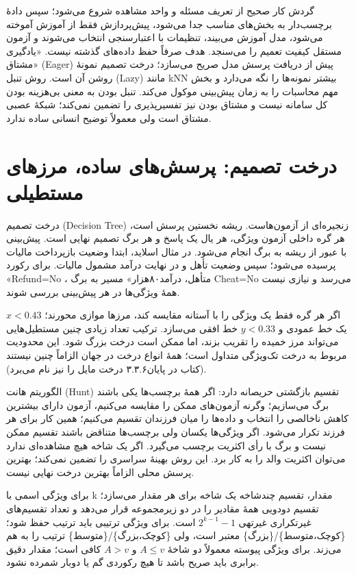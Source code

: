 گردش کار صحیح از تعریف مسئله و واحد مشاهده شروع می‌شود؛ سپس دادهٔ برچسب‌دار به بخش‌های مناسب جدا می‌شود، پیش‌پردازش فقط از آموزش آموخته می‌شود، مدل آموزش می‌بیند، تنظیمات با اعتبارسنجی انتخاب می‌شوند و آزمون مستقل کیفیت تعمیم را می‌سنجد. هدف صرفاً حفظ داده‌های گذشته نیست. «یادگیری مشتاق» (Eager) پیش از دریافت پرسش مدل صریح می‌سازد؛ درخت تصمیم نمونهٔ روشن آن است. روش تنبل (Lazy) مانند kNN بیشتر نمونه‌ها را نگه می‌دارد و بخش مهم محاسبات را به زمان پیش‌بینی موکول می‌کند. تنبل بودن به معنی بی‌هزینه بودن کل سامانه نیست و مشتاق بودن نیز تفسیرپذیری را تضمین نمی‌کند؛ شبکهٔ عصبی مشتاق است ولی معمولاً توضیح انسانی ساده ندارد.



\section{درخت تصمیم: پرسش‌های ساده، مرزهای مستطیلی}

درخت تصمیم (Decision Tree) زنجیره‌ای از آزمون‌هاست. ریشه نخستین پرسش است، هر گره داخلی آزمون ویژگی، هر یال یک پاسخ و هر برگ تصمیم نهایی است. پیش‌بینی با عبور از ریشه به برگ انجام می‌شود. در مثال اسلاید، ابتدا وضعیت بازپرداخت مالیات پرسیده می‌شود؛ سپس وضعیت تأهل و در نهایت درآمد مشمول مالیات. برای رکورد «Refund=No ، متأهل، درآمد۸۰هزار» مسیر به برگ Cheat=No می‌رسد و نیازی نیست همهٔ ویژگی‌ها در هر پیش‌بینی بررسی شوند.

اگر هر گره فقط یک ویژگی را با آستانه مقایسه کند، مرزها موازی محورند؛ $x<0.43$ یک خط عمودی و $y<0.33$ خط افقی می‌سازد. ترکیب تعداد زیادی چنین مستطیل‌هایی می‌تواند مرز خمیده را تقریب بزند، اما ممکن است درخت بزرگ شود. این محدودیت مربوط به درخت تک‌ویژگی متداول است؛ همهٔ انواع درخت در جهان الزاماً چنین نیستند (کتاب در پایان۳.۳.۶ درخت مایل را نیز نام می‌برد).

الگوریتم هانت (Hunt) تقسیم بازگشتی حریصانه دارد: اگر همهٔ برچسب‌ها یکی باشند برگ می‌سازیم؛ وگرنه آزمون‌های ممکن را مقایسه می‌کنیم، آزمون دارای بیشترین کاهش ناخالصی را انتخاب و داده‌ها را میان فرزندان تقسیم می‌کنیم؛ همین کار برای هر فرزند تکرار می‌شود. اگر ویژگی‌ها یکسان ولی برچسب‌ها متناقض باشند تقسیم ممکن نیست و برگ با رأی اکثریت برچسب می‌گیرد. اگر یک شاخه هیچ مشاهده‌ای ندارد می‌توان اکثریت والد را به کار برد. این روش بهینهٔ سراسری را تضمین نمی‌کند؛ بهترین پرسش محلی الزاماً بهترین درخت نهایی نیست.

برای ویژگی اسمی با k مقدار، تقسیم چندشاخه یک شاخه برای هر مقدار می‌سازد؛ تقسیم دودویی همهٔ مقادیر را در دو زیرمجموعه قرار می‌دهد و تعداد تقسیم‌های غیرتکراری غیرتهی $2^{k-1}-1$ است. برای ویژگی ترتیبی باید ترتیب حفظ شود؛ \{کوچک،متوسط\}/\{بزرگ\} معتبر است، ولی \{کوچک،بزرگ\}/\{متوسط\} ترتیب را به هم می‌زند. برای ویژگی پیوسته معمولاً دو شاخهٔ $A\le v$ و $A>v$ کافی است؛ مقدار دقیق برابری باید صریح باشد تا هیچ رکوردی گم یا دوبار شمرده نشود.


